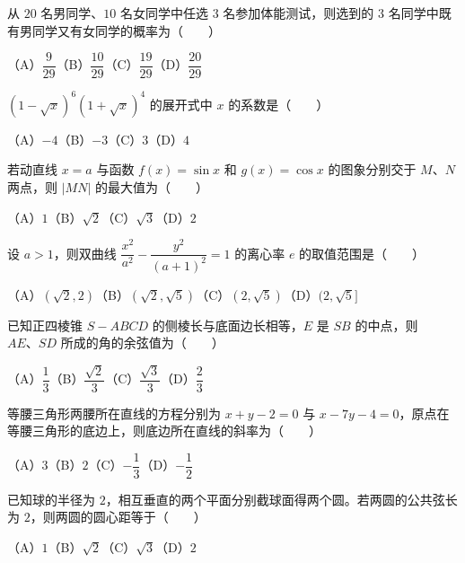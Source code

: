 \begin{question}
从 $20$ 名男同学、$10$ 名女同学中任选 $3$ 名参加体能测试，则选到的 $3$ 名同学中既有男同学又有女同学的概率为\mbox{（　　）}

（A）$\dfrac9{29}$\quad（B）$\dfrac{10}{29}$\quad（C）$\dfrac{19}{29}$\quad（D）$\dfrac{20}{29}$

\end{question}
\begin{question}
$(1-\sqrt{x})^6(1+\sqrt{x})^4$ 的展开式中 $x$ 的系数是\mbox{（　　）}

（A）$-4$\quad（B）$-3$\quad（C）$3$\quad（D）$4$

\end{question}
\begin{question}
若动直线 $x=a$ 与函数 $f(x)=\sin x$ 和 $g(x)=\cos x$ 的图象分别交于 $M\text{、}N$ 两点，则 $|MN|$ 的最大值为\mbox{（　　）}

（A）$1$\quad（B）$\sqrt2$\quad（C）$\sqrt3$\quad（D）$2$

\end{question}
\begin{question}
设 $a>1$，则双曲线 $\dfrac{x^2}{a^2}-\dfrac{y^2}{(a+1)^2}=1$ 的离心率 $e$ 的取值范围是\mbox{（　　）}

（A）$(\sqrt2,2)$\quad（B）$(\sqrt2,\sqrt5)$\quad（C）$(2,\sqrt5)$\quad（D）$(2,\sqrt5]$

\end{question}
\begin{question}
已知正四棱锥 $S-ABCD$ 的侧棱长与底面边长相等，$E$ 是 $SB$ 的中点，则 $AE\text{、}SD$ 所成的角的余弦值为\mbox{（　　）}

（A）$\dfrac13$\quad（B）$\dfrac{\sqrt2}{3}$\quad（C）$\dfrac{\sqrt3}{3}$\quad（D）$\dfrac23$

\end{question}
\begin{question}
等腰三角形两腰所在直线的方程分别为 $x+y-2=0$ 与 $x-7y-4=0$，原点在等腰三角形的底边上，则底边所在直线的斜率为\mbox{（　　）}

（A）$3$\quad（B）$2$\quad（C）$-\dfrac13$\quad（D）$-\dfrac12$

\end{question}
\begin{question}
已知球的半径为 $2$，相互垂直的两个平面分别截球面得两个圆。若两圆的公共弦长为 $2$，则两圆的圆心距等于\mbox{（　　）}

（A）$1$\quad（B）$\sqrt2$\quad（C）$\sqrt3$\quad（D）$2$

\end{question}

